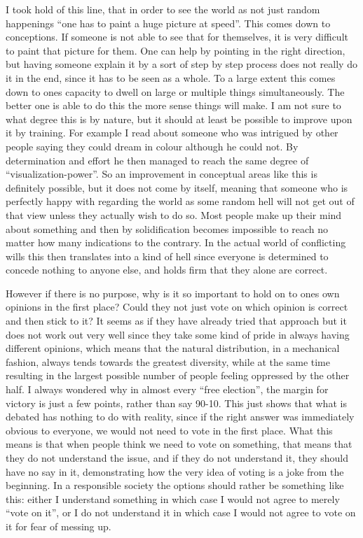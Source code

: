 \begin{footnotesize}
\begin{sffamily}
I took hold of this line, that in order to see the world as not just random happenings “one has to paint a huge picture
at speed”. This comes down to conceptions. If someone is not able to see that for themselves, it is very difficult to
paint that picture for them. One can help by pointing in the right direction, but having someone explain it by a sort
of step by step process does not really do it in the end, since it has to be seen as a whole. To a large extent this
comes down to ones capacity to dwell on large or multiple things simultaneously. The better one is able to do this the
more sense things will make. I am not sure to what degree this is by nature, but it should at least be possible to
improve upon it by training. For example I read about someone who was intrigued by other people saying they could dream
in colour although he could not. By determination and effort he then managed to reach the same degree of
“visualization-power”. So an improvement in conceptual areas like this is definitely possible, but it does not come by
itself, meaning that someone who is perfectly happy with regarding the world as some random hell will not get out of
that view unless they actually wish to do so. Most people make up their mind about something and then by solidification
becomes impossible to reach no matter how many indications to the contrary. In the actual world of conflicting wills
this then translates into a kind of hell since everyone is determined to concede nothing to anyone else, and holds firm
that they alone are correct.

However if there is no purpose, why is it so important to hold on to ones own opinions in the first place? Could they
not just vote on which opinion is correct and then stick to it? It seems as if they have already tried that approach
but it does not work out very well since they take some kind of pride in always having different opinions, which means
that the natural distribution, in a mechanical fashion, always tends towards the greatest diversity, while at the same
time resulting in the largest possible number of people feeling oppressed by the other half. I always wondered why in
almost every “free election”, the margin for victory is just a few points, rather than say 90-10. This just shows that
what is debated has nothing to do with reality, since if the right answer was immediately obvious to everyone, we would
not need to vote in the first place. What this means is that when people think we need to vote on something, that means
that they do not understand the issue, and if they do not understand it, they should have no say in it, demonstrating
how the very idea of voting is a joke from the beginning. In a responsible society the options should rather be
something like this: either I understand something in which case I would not agree to merely “vote on it”, or I do not
understand it in which case I would not agree to vote on it for fear of messing up.

\end{sffamily}\end{footnotesize}